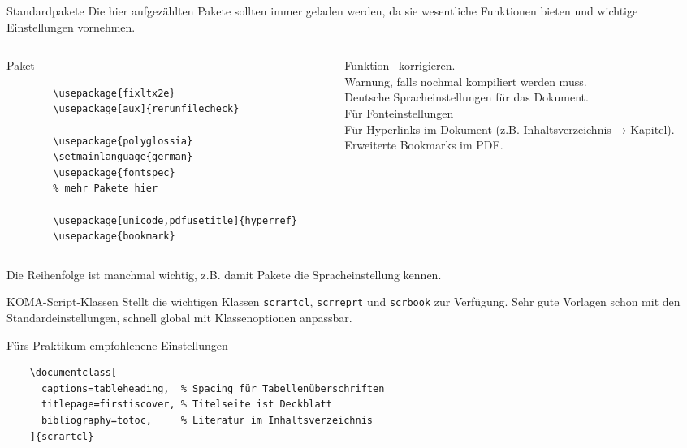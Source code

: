 \begin{frame}[fragile]{Standardpakete}
  Die hier aufgezählten Pakete sollten immer geladen werden, da sie wesentliche Funktionen bieten und wichtige Einstellungen vornehmen.
  \begin{columns}[onlytextwidth, t]
    \begin{column}{0.48\textwidth}
      \begin{block}{Paket}
        \begin{lstlisting}
        \usepackage{fixltx2e}
        \usepackage[aux]{rerunfilecheck}

        \usepackage{polyglossia}
        \setmainlanguage{german}
        \usepackage{fontspec}
        % mehr Pakete hier

        \usepackage[unicode,pdfusetitle]{hyperref}
        \usepackage{bookmark}
        \end{lstlisting}
      \end{block}
    \end{column}
    \begin{column}{0.48\textwidth}
      \begin{block}{Funktion}
        \LaTeXe\ korrigieren. \\
        Warnung, falls nochmal kompiliert werden muss. \\
        Deutsche Spracheinstellungen für das Dokument. \\
        Für Fonteinstellungen \\[2\baselineskip]
        Für Hyperlinks im Dokument (z.B. Inhaltsverzeichnis → Kapitel). \\
        Erweiterte Bookmarks im PDF.
      \end{block}
    \end{column}
  \end{columns}

  \vspace{5pt}
  Die Reihenfolge ist manchmal wichtig, z.B. damit Pakete die Spracheinstellung kennen.
\end{frame}

\begin{frame}[fragile]{
  KOMA-Script-Klassen
  \hfill{}
}
  Stellt die wichtigen Klassen \texttt{scrartcl}, \texttt{scrreprt} und \texttt{scrbook} zur Verfügung.
  Sehr gute Vorlagen schon mit den Standardeinstellungen, schnell global mit Klassenoptionen anpassbar.
  \begin{block}{Fürs Praktikum empfohlenene Einstellungen}
    \begin{lstlisting}
    \documentclass[
      captions=tableheading,  % Spacing für Tabellenüberschriften
      titlepage=firstiscover, % Titelseite ist Deckblatt
      bibliography=totoc,     % Literatur im Inhaltsverzeichnis
    ]{scrartcl}
    \end{lstlisting}
  \end{block}
\end{frame}

